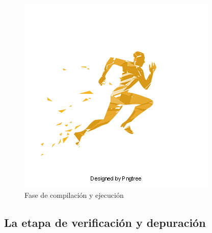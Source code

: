 \documentclass[a4paper,12pt,spanish]{article}
\begin{document}
\begin{figure}[H]
  \centering
  \includegraphics[scale=0.2]{running}
  \caption{Fase de compilación y ejecución}
  \label{fig:documentacion}
\end{figure}



\subsection{La etapa de verificación y depuración}
\label{sec:la-etapa-de-2}
\end{document}
